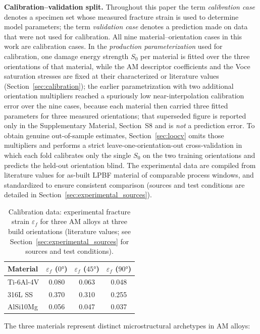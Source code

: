 \documentclass[12pt,a4paper,twocolumn]{article}
\begin{document}
\textbf{Calibration--validation split.} Throughout this paper the term \emph{calibration case} denotes a specimen set whose measured fracture strain is used to determine model parameters; the term \emph{validation case} denotes a prediction made on data that were not used for calibration. All nine material--orientation cases in this work are calibration cases. In the \emph{production parameterization} used for calibration, one damage energy strength $S_0$ per material is fitted over the three orientations of that material, while the AM descriptor coefficients and the Voce saturation stresses are fixed at their characterized or literature values (Section~\ref{sec:calibration}); the earlier parametrization with two additional orientation multipliers reached a spuriously low near-interpolation calibration error over the nine cases, because each material then carried three fitted parameters for three measured orientations; that superseded figure is reported only in the Supplementary Material, Section~S8 and is \emph{not} a prediction error. To obtain genuine out-of-sample estimates, Section~\ref{sec:loocv} omits those multipliers and performs a strict leave-one-orientation-out cross-validation in which each fold calibrates only the single $S_0$ on the two training orientations and predicts the held-out orientation blind. The experimental data are compiled from literature values for as-built LPBF material of comparable process windows, and standardized to ensure consistent comparison (sources and test conditions are detailed in Section~\ref{sec:experimental_sources}).

\begin{table}[htbp]
\centering
\caption{Calibration data: experimental fracture strain $\varepsilon_f$ for three AM alloys at three build orientations (literature values; see Section~\ref{sec:experimental_sources} for sources and test conditions).}
\label{tab:experimental}
\footnotesize
\begin{tabular}{lccc}
\toprule
\textbf{Material} & $\varepsilon_f$ ($\ang{0}$) & $\varepsilon_f$ ($\ang{45}$) & $\varepsilon_f$ ($\ang{90}$) \\
\midrule
Ti-6Al-4V & 0.080 & 0.063 & 0.048 \\
316L SS   & 0.370 & 0.310 & 0.255 \\
AlSi10Mg  & 0.056 & 0.047 & 0.037 \\
\bottomrule
\end{tabular}
\end{table}

The three materials represent distinct microstructural archetypes in AM alloys:
\end{document}

